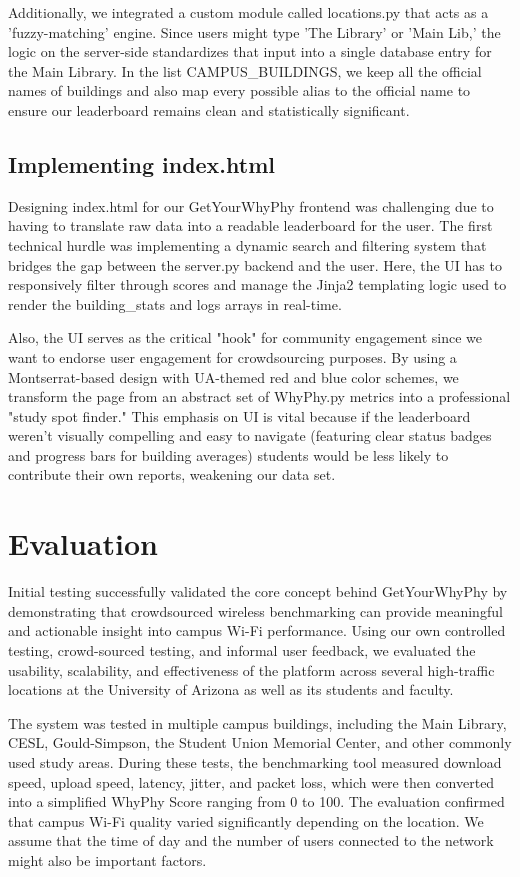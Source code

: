 \documentclass[sigconf]{acmart}
\begin{document}
Additionally, we integrated a custom module called locations.py that acts as a 'fuzzy-matching' engine. Since users might type 'The Library' or 'Main Lib,' the logic on the server-side standardizes that input into a single database entry for the Main Library. In the list CAMPUS\_BUILDINGS, we keep all the official names of buildings and also map every possible alias to the official name to ensure our leaderboard remains clean and statistically significant.

\subsection{Implementing index.html}
Designing index.html for our GetYourWhyPhy frontend was challenging due to having to translate raw data into a readable leaderboard for the user. The first technical hurdle was implementing a dynamic search and filtering system that bridges the gap between the server.py backend and the user. Here, the UI has to responsively filter through scores and manage the Jinja2 templating logic used to render the building\_stats and logs arrays in real-time.

Also, the UI serves as the critical "hook" for community engagement since we want to endorse user engagement for crowdsourcing purposes. By using a Montserrat-based design with UA-themed red and blue color schemes, we transform the page from an abstract set of WhyPhy.py metrics into a professional "study spot finder." This emphasis on UI is vital because if the leaderboard weren't visually compelling and easy to navigate (featuring clear status badges and progress bars for building averages) students would be less likely to contribute their own reports, weakening our data set.

\section{Evaluation}
Initial testing successfully validated the core concept behind GetYourWhyPhy by demonstrating that crowdsourced wireless benchmarking can provide meaningful and actionable insight into campus Wi-Fi performance. Using our own controlled testing, crowd-sourced testing, and informal user feedback, we evaluated the usability, scalability, and effectiveness of the platform across several high-traffic locations at the University of Arizona as well as its students and faculty.

The system was tested in multiple campus buildings, including the Main Library, CESL, Gould-Simpson, the Student Union Memorial Center, and other commonly used study areas. During these tests, the benchmarking tool measured download speed, upload speed, latency, jitter, and packet loss, which were then converted into a simplified WhyPhy Score ranging from 0 to 100. The evaluation confirmed that campus Wi-Fi quality varied significantly depending on the location. We assume that the time of day and the number of users connected to the network might also be important factors.
\end{document}
